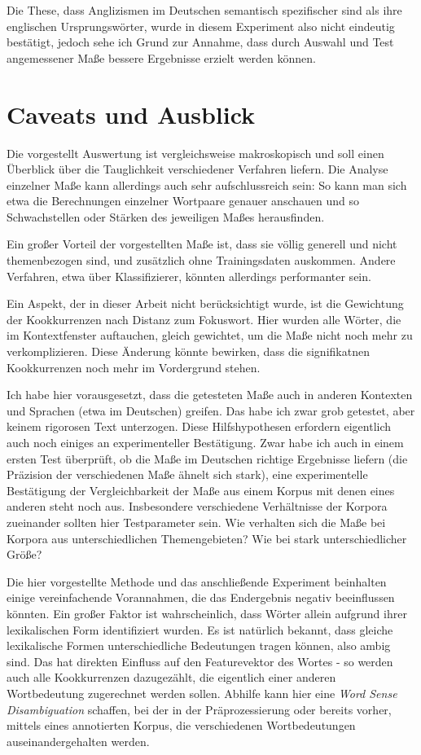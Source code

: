 \documentclass[11pt,numbers=noenddot]{scrartcl}
\begin{document}
Die These, dass Anglizismen im Deutschen semantisch spezifischer sind als ihre englischen Ursprungswörter, wurde in diesem Experiment also nicht eindeutig bestätigt, jedoch sehe ich Grund zur Annahme, dass durch Auswahl und Test angemessener Maße bessere Ergebnisse erzielt werden können.

\section{Caveats und Ausblick} \label{ausblick}

Die vorgestellt Auswertung ist vergleichsweise makroskopisch und soll einen Überblick über die Tauglichkeit verschiedener Verfahren liefern. Die Analyse einzelner Maße kann allerdings auch sehr aufschlussreich sein: So kann man sich etwa die Berechnungen einzelner Wortpaare genauer anschauen und so Schwachstellen oder Stärken des jeweiligen Maßes herausfinden.

Ein großer Vorteil der vorgestellten Maße ist, dass sie völlig generell und nicht themenbezogen sind, und zusätzlich ohne Trainingsdaten auskommen. Andere Verfahren, etwa über Klassifizierer, könnten allerdings performanter sein.

Ein Aspekt, der in dieser Arbeit nicht berücksichtigt wurde, ist die Gewichtung der Kookkurrenzen nach Distanz zum Fokuswort. Hier wurden alle Wörter, die im Kontextfenster auftauchen, gleich gewichtet, um die Maße nicht noch mehr zu verkomplizieren. Diese Änderung könnte bewirken, dass die signifikatnen Kookkurrenzen noch mehr im Vordergrund stehen.

Ich habe hier vorausgesetzt, dass die getesteten Maße auch in anderen Kontexten und Sprachen (etwa im Deutschen) greifen. Das habe ich zwar grob getestet, aber keinem rigorosen Text unterzogen. Diese Hilfshypothesen erfordern eigentlich auch noch einiges an experimenteller Bestätigung. Zwar habe ich auch in einem ersten Test überprüft, ob die Maße im Deutschen richtige Ergebnisse liefern (die Präzision der verschiedenen Maße ähnelt sich stark), eine experimentelle Bestätigung der Vergleichbarkeit der Maße aus einem Korpus mit denen eines anderen steht noch aus. Insbesondere verschiedene Verhältnisse der Korpora zueinander sollten hier Testparameter sein. Wie verhalten sich die Maße bei Korpora aus unterschiedlichen Themengebieten? Wie bei stark unterschiedlicher Größe?

Die hier vorgestellte Methode und das anschließende Experiment beinhalten einige vereinfachende Vorannahmen, die das Endergebnis negativ beeinflussen könnten. Ein großer Faktor ist wahrscheinlich, dass Wörter allein aufgrund ihrer lexikalischen Form identifiziert wurden. Es ist natürlich bekannt, dass gleiche lexikalische Formen unterschiedliche Bedeutungen tragen können, also ambig sind. Das hat direkten Einfluss auf den Featurevektor des Wortes - so werden auch alle Kookkurrenzen dazugezählt, die eigentlich einer anderen Wortbedeutung zugerechnet werden sollen. Abhilfe kann hier eine \emph{Word Sense Disambiguation} schaffen, bei der in der Präprozessierung oder bereits vorher, mittels eines annotierten Korpus, die verschiedenen Wortbedeutungen auseinandergehalten werden.
\end{document}

